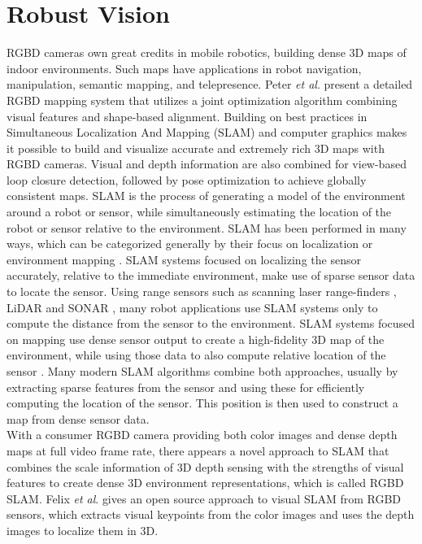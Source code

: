 \section{Robust Vision}
\indent
\gls{RGBD} cameras own great credits in mobile robotics, building dense \gls{3D} maps of indoor environments. Such maps have applications in robot navigation, manipulation, semantic mapping, and telepresence. Peter \textit{et al}. \cite{indorMappingRGBD_2014} present a detailed \gls{RGBD} mapping system that utilizes a joint optimization algorithm combining visual features and shape-based alignment. Building on best practices in Simultaneous Localization And Mapping (\gls{SLAM}) and computer graphics makes it possible to build and visualize accurate and extremely rich \gls{3D} maps with \gls{RGBD} cameras. Visual and depth information are also combined for view-based loop closure detection, followed by pose optimization to achieve globally consistent maps. \gls{SLAM} is the process of generating a model of the environment around a robot or sensor, while simultaneously estimating the location of the robot or sensor relative to the environment. \gls{SLAM} has been performed in many ways, which can be categorized generally by their focus on localization or environment mapping \cite{SLAMintro_2015}. \gls{SLAM} systems focused on localizing the sensor accurately, relative to the immediate environment, make use of sparse sensor data to locate the sensor. Using range sensors such as scanning laser range-finders \cite{laserSLAM_2011}, LiDAR and SONAR \cite{sonarSLAM_2013}, many robot applications use \gls{SLAM} systems only to compute the distance from the sensor to the environment. \gls{SLAM} systems focused on mapping use dense sensor output to create a high-fidelity \gls{3D} map of the environment, while using those data to also compute relative location of the sensor \cite{KinectFusion_2011, mapSLAM_2013}. Many modern \gls{SLAM} algorithms combine both approaches, usually by extracting sparse features from the sensor and using these for efficiently computing the location of the sensor. This position is then used to construct a map from dense sensor data. 
\\\indent
With a consumer \gls{RGBD} camera providing both color images and dense depth maps at full video frame rate, there appears a novel approach to \gls{SLAM} that combines the scale information of \gls{3D} depth sensing with the strengths of visual features to create dense \gls{3D} environment representations, which is called \gls{RGBD} \gls{SLAM}. Felix \textit{et al}. \cite{RGBDSLAM01_2012} gives an open source approach to visual \gls{SLAM} from \gls{RGBD} sensors, which extracts visual keypoints from the color images and uses the depth images to localize them in \gls{3D}. %
